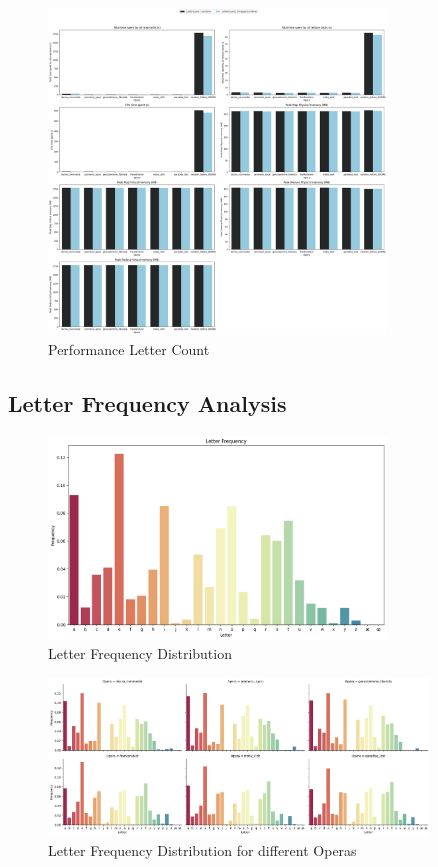 \begin{figure}[H]
  \centering
  \includegraphics[width=0.8\textwidth]{media/performance/performance_LetterCount.png}
  \caption{Performance Letter Count}
\end{figure}

\newpage

\subsection{Letter Frequency Analysis}

\begin{figure}[H]
  \centering
  \includegraphics[width=0.8\textwidth]{media/qualitative analysis/letter_freq_dist.png}
  \caption{Letter Frequency Distribution}
  \label{fig:letter_freq_dist}
\end{figure}

\begin{figure}[H]
  \centering
  \includegraphics[width=0.9\textwidth]{media/qualitative analysis/letter_freq_dist_opera.png}
  \caption{Letter Frequency Distribution for different Operas}
  \label{fig:letter_freq_dist_opera}
\end{figure}

